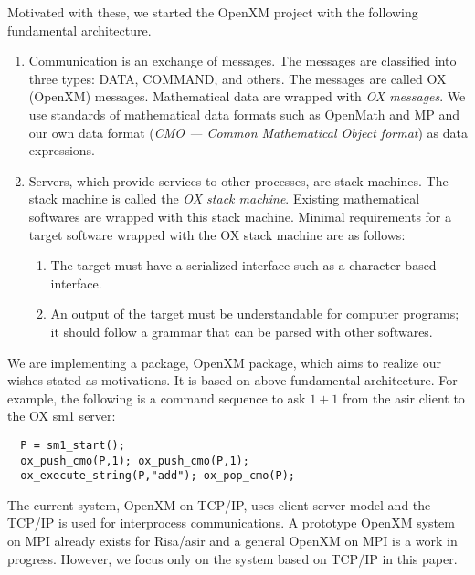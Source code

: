 Motivated with these, we started the OpenXM project with the following
fundamental architecture.
\begin{enumerate}
\item Communication is an exchange of messages. The messages are classified into
three types:
DATA, COMMAND, and others.
The messages are called OX (OpenXM) messages.
Mathematical data are wrapped with {\it OX messages}.
We use standards of mathematical data formats such as OpenMath and MP
and our own data format ({\it CMO --- Common Mathematical Object format})
as data expressions.
\item Servers, which provide services to other processes, are stack machines.
The stack machine is called the
{\it OX stack machine}.
Existing mathematical softwares are wrapped with this stack machine.
Minimal requirements for a target software wrapped with the OX stack machine
are as follows:
\begin{enumerate}
\item The target must have a serialized interface such as a character based
interface.
\item An output of the target must be understandable for computer programs;
it should follow a grammar that can be parsed with other softwares.
\end{enumerate}
\end{enumerate}
We are implementing a package, OpenXM package,  
which aims to realize our wishes stated as motivations.
It is based on above fundamental architecture.
For example, the following is a command sequence to ask $1+1$ from
the asir client to the OX sm1 server:
\begin{verbatim}
  P = sm1_start();
  ox_push_cmo(P,1); ox_push_cmo(P,1);
  ox_execute_string(P,"add"); ox_pop_cmo(P);
\end{verbatim}
The current system, OpenXM on TCP/IP, 
uses client-server model and the TCP/IP is used for interprocess
communications.
A prototype OpenXM system on MPI \cite{MPI} already exists for Risa/asir and
a general OpenXM on MPI is a work in progress.
However, we focus only on the system based on TCP/IP in this paper.



